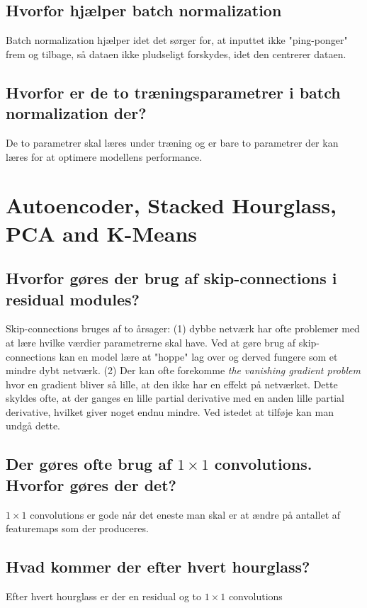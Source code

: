 \documentclass[a4paper]{article}
\begin{document}
\subsection{Hvorfor hjælper batch normalization}
Batch normalization hjælper idet det sørger for, at inputtet ikke "ping-ponger" frem og tilbage, så dataen ikke pludseligt forskydes, idet den centrerer dataen.

\subsection{Hvorfor er de to træningsparametrer i batch normalization der?}
De to parametrer skal læres under træning og er bare to parametrer der kan læres for at optimere modellens performance.

\section{Autoencoder, Stacked Hourglass, PCA and K-Means}
\subsection{Hvorfor gøres der brug af skip-connections i residual modules?}
Skip-connections bruges af to årsager: (1) dybbe netværk har ofte problemer med at lære hvilke værdier parametrerne skal have. Ved at gøre brug af skip-connections kan en model lære at "hoppe" lag over og derved fungere som et mindre dybt netværk. (2) Der kan ofte forekomme \textit{the vanishing gradient problem} hvor en gradient bliver så lille, at den ikke har en effekt på netværket. Dette skyldes ofte, at der ganges en lille partial derivative med en anden lille partial derivative, hvilket giver noget endnu mindre. Ved istedet at tilføje kan man undgå dette.

\subsection{Der gøres ofte brug af $1 \times 1$ convolutions. Hvorfor gøres der det?}
$1 \times 1$ convolutions er gode når det eneste man skal er at ændre på antallet af featuremaps som der produceres.

\subsection{Hvad kommer der efter hvert hourglass?}
Efter hvert hourglass er der en residual og to $1 \times 1$ convolutions
\end{document}
